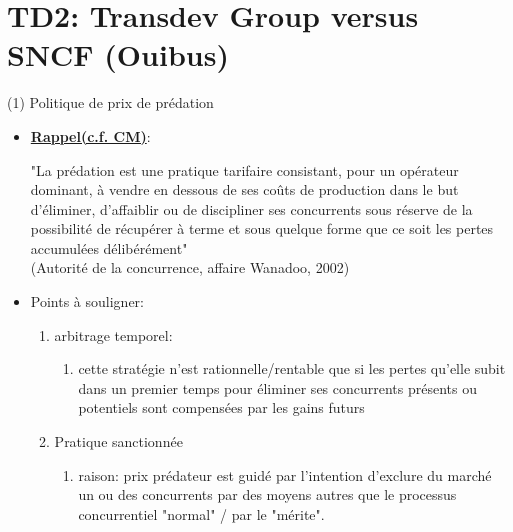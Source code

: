 \section{TD2:  Transdev Group versus SNCF (Ouibus)}
\frame{\sectionpage}
\begin{frame}[allowframebreaks]{(1) Politique de prix de prédation}
\begin{itemize}
\item \textbf{\underline{Rappel(c.f. CM)}}:

\medskip

"La prédation est une pratique tarifaire consistant, pour un opérateur dominant, à vendre en dessous de ses coûts de production dans le but d’éliminer, d’affaiblir ou de discipliner ses concurrents sous réserve de la possibilité de récupérer
 à terme et sous quelque forme que ce soit les pertes accumulées délibérément"\\
 (Autorité de la concurrence, affaire Wanadoo, 2002)

 \item Points à souligner: 
 \begin{enumerate}[-]
\item arbitrage temporel: 
\begin{enumerate}[$\star$]
    \item cette stratégie n’est rationnelle/rentable que si les pertes qu’elle subit dans un premier temps pour éliminer ses concurrents présents ou potentiels sont compensées par les gains futurs
\end{enumerate} 
\item Pratique sanctionnée
\begin{enumerate}[$\star$]
    \item raison: prix prédateur est guidé par l’intention 
    d’exclure du marché un ou des concurrents par des moyens autres que le processus concurrentiel "normal" / par le "mérite".
\end{enumerate} 
 \end{enumerate}
\end{itemize}
\end{frame} 

